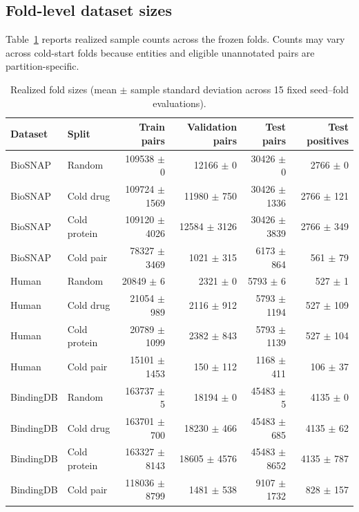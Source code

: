 \subsection{Fold-level dataset sizes}
Table~\ref{tab:fold-sizes} reports realized sample counts across the frozen folds. Counts may vary across cold-start folds because entities and eligible unannotated pairs are partition-specific.
\begin{table}[t]
\centering
\scriptsize
\begin{tabular}{llrrrr}
\toprule
Dataset & Split & Train pairs & Validation pairs & Test pairs & Test positives \\
\midrule
BioSNAP & Random & 109538 $\pm$ 0 & 12166 $\pm$ 0 & 30426 $\pm$ 0 & 2766 $\pm$ 0 \\
BioSNAP & Cold drug & 109724 $\pm$ 1569 & 11980 $\pm$ 750 & 30426 $\pm$ 1336 & 2766 $\pm$ 121 \\
BioSNAP & Cold protein & 109120 $\pm$ 4026 & 12584 $\pm$ 3126 & 30426 $\pm$ 3839 & 2766 $\pm$ 349 \\
BioSNAP & Cold pair & 78327 $\pm$ 3469 & 1021 $\pm$ 315 & 6173 $\pm$ 864 & 561 $\pm$ 79 \\
\midrule
Human & Random & 20849 $\pm$ 6 & 2321 $\pm$ 0 & 5793 $\pm$ 6 & 527 $\pm$ 1 \\
Human & Cold drug & 21054 $\pm$ 989 & 2116 $\pm$ 912 & 5793 $\pm$ 1194 & 527 $\pm$ 109 \\
Human & Cold protein & 20789 $\pm$ 1099 & 2382 $\pm$ 843 & 5793 $\pm$ 1139 & 527 $\pm$ 104 \\
Human & Cold pair & 15101 $\pm$ 1453 & 150 $\pm$ 112 & 1168 $\pm$ 411 & 106 $\pm$ 37 \\
\midrule
BindingDB & Random & 163737 $\pm$ 5 & 18194 $\pm$ 0 & 45483 $\pm$ 5 & 4135 $\pm$ 0 \\
BindingDB & Cold drug & 163701 $\pm$ 700 & 18230 $\pm$ 466 & 45483 $\pm$ 685 & 4135 $\pm$ 62 \\
BindingDB & Cold protein & 163327 $\pm$ 8143 & 18605 $\pm$ 4576 & 45483 $\pm$ 8652 & 4135 $\pm$ 787 \\
BindingDB & Cold pair & 118036 $\pm$ 8799 & 1481 $\pm$ 538 & 9107 $\pm$ 1732 & 828 $\pm$ 157 \\
\bottomrule
\end{tabular}
\caption{Realized fold sizes (mean $\pm$ sample standard deviation across 15 fixed seed--fold evaluations).}
\label{tab:fold-sizes}
\end{table}
